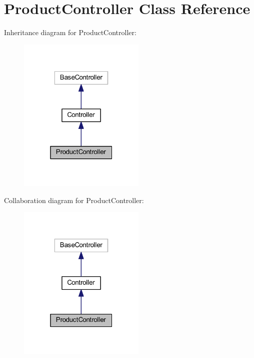 \hypertarget{class_app_1_1_http_1_1_controllers_1_1_product_1_1_product_controller}{}\section{Product\+Controller Class Reference}
\label{class_app_1_1_http_1_1_controllers_1_1_product_1_1_product_controller}


Inheritance diagram for Product\+Controller\+:
\nopagebreak
\begin{figure}[H]
\begin{center}
\leavevmode
\includegraphics[width=172pt]{class_app_1_1_http_1_1_controllers_1_1_product_1_1_product_controller__inherit__graph}
\end{center}
\end{figure}


Collaboration diagram for Product\+Controller\+:
\nopagebreak
\begin{figure}[H]
\begin{center}
\leavevmode
\includegraphics[width=172pt]{class_app_1_1_http_1_1_controllers_1_1_product_1_1_product_controller__coll__graph}
\end{center}
\end{figure}
